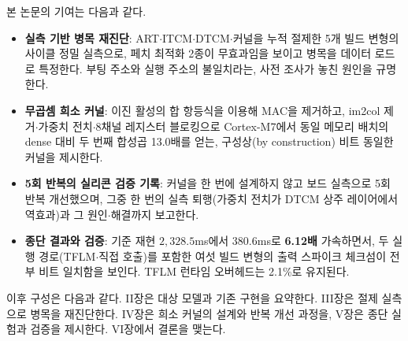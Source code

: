 본 논문의 기여는 다음과 같다.
\begin{itemize}
\item \textbf{실측 기반 병목 재진단}: ART$\cdot$ITCM$\cdot$DTCM$\cdot$커널을
  누적 절제한 5개 빌드 변형의 사이클 정밀 실측으로, 페치 최적화
  2종이 무효과임을 보이고 병목을 데이터 로드로 특정한다. 부팅 주소와
  실행 주소의 불일치라는, 사전 조사가 놓친 원인을 규명한다.
\item \textbf{무곱셈 희소 커널}: 이진 활성의 합 항등식을 이용해
  MAC을 제거하고, im2col 제거$\cdot$가중치 전치$\cdot$8채널 레지스터
  블로킹으로 Cortex-M7에서 동일 메모리 배치의 dense 대비 두 번째
  합성곱 13.0배를 얻는, 구성상(by construction) 비트 동일한 커널을
  제시한다.
\item \textbf{5회 반복의 실리콘 검증 기록}: 커널을 한 번에 설계하지
  않고 보드 실측으로 5회 반복 개선했으며, 그중 한 번의 실측 퇴행(가중치
  전치가 DTCM 상주 레이어에서 역효과)과 그 원인$\cdot$해결까지 보고한다.
\item \textbf{종단 결과와 검증}: 기준 재현 $2{,}328.5$ms에서
  $380.6$ms로 \textbf{6.12배} 가속하면서, 두 실행 경로(TFLM$\cdot$직접
  호출)를 포함한 여섯 빌드 변형의 출력 스파이크 체크섬이 전부 비트
  일치함을 보인다. TFLM 런타임 오버헤드는 2.1\%로 유지된다.
\end{itemize}

이후 구성은 다음과 같다. II장은 대상 모델과 기존
구현을 요약한다. III장은 절제 실측으로 병목을
재진단한다. IV장은 희소 커널의 설계와 반복 개선 과정을,
V장은 종단 실험과 검증을 제시한다. VI장에서 결론을 맺는다.
